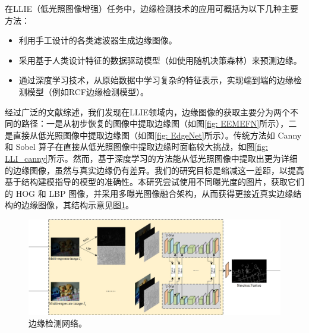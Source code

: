 \documentclass[a4paper]{ctexart}
\begin{document}
	在LLIE（低光照图像增强）任务中，边缘检测技术的应用可概括为以下几种主要方法：
	
	\begin{itemize}
		\item [(1)] 利用手工设计的各类滤波器生成边缘图像。
		
		\item [(2)] 采用基于人类设计特征的数据驱动模型（如使用随机决策森林）来预测边缘。
		
		\item [(3)] 通过深度学习技术，从原始数据中学习复杂的特征表示，实现端到端的边缘检测模型（例如RCF边缘检测模型\cite{liu2017richer}）。
	\end{itemize}
	
	经过广泛的文献综述，我们发现在LLIE领域内，边缘图像的获取主要分为两个不同的路径：一是从初步恢复的图像中提取边缘图（如图\ref{fig: EEMEFN}所示），二是直接从低光照图像中提取边缘图（如图\ref{fig: EdgeNet}所示）。传统方法如 Canny 和 Sobel 算子\cite{maini2009study}在直接从低光照图像中提取边缘时面临较大挑战，如图\ref{fig: LLI_canny}所示。然而，基于深度学习的方法能从低光照图像中提取出更为详细的边缘图像，虽然与真实边缘仍有差异。我们的研究目标是缩减这一差距，以提高基于结构建模指导的模型的准确性。本研究尝试使用不同曝光度的图片，获取它们的 HOG 和 LBP 图像，并采用多曝光图像融合架构，从而获得更接近真实边缘结构的边缘图像，其结构示意见图\ref{fig: Edge Detection Network}。
	
	
	
	\begin{figure}[htb]
		\centering 
		\includegraphics[width=\columnwidth]{picture/LLIE/My Architecture/Edge Detection Network}
		\caption{
			\label{fig: Edge Detection Network} 
			边缘检测网络。
		}
	\end{figure}
	\FloatBarrier
	
\end{document}
